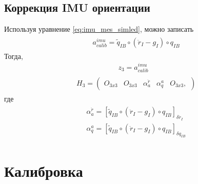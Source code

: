 \documentclass[a4paper,12pt]{article}
\begin{document}
\subsection{Коррекция IMU ориентации}
Используя уравнение \eqref{eq:imu_mes_simled}, можно записать
\begin{align} 
\begin{split}
&a^{imu}_{calib}  = \tilde{q}_{IB} \circ (\ddot{r}_{I} - g_I) \circ q_{IB}
\end{split}
\end{align}
Тогда, 
\begin{align}
z_3 = a^{imu}_{calib}
\end{align}
\begin{align}
\begin{split}
&H_3 =
\begin{pmatrix}
O_{3x3} & O_{3x3} & \alpha^{\ddot{r}}_a & \alpha^a_q & O_{3x3},
\end{pmatrix}
\end{split}
\end{align}
где
\begin{align}
\begin{split}
&\alpha^{\ddot{r}}_a = [\tilde{q}_{IB} \circ (\ddot{r}_{I} - g_I) \circ q_{IB}]_{\delta \ddot{r}_I} \\
&\alpha^a_q = [\tilde{q}_{IB} \circ (\ddot{r}_{I} - g_I) \circ q_{IB}]_{\delta {q}_{IB}}
\end{split}
\end{align}

\section{Калибровка}
\end{document}
